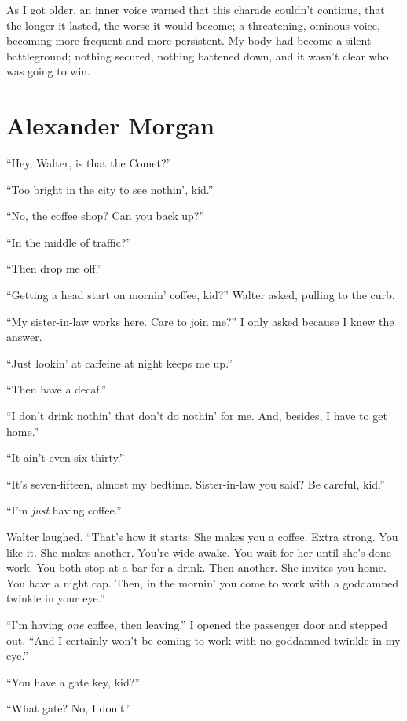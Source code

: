 As I got older, an inner voice warned that this charade couldn't
continue, that the longer it lasted, the worse it would become; a
threatening, ominous voice, becoming more frequent and more persistent.
My body had become a silent battleground; nothing secured, nothing
battened down, and it wasn't clear who was going to win.

\chapter{Alexander Morgan}

\titlemark

\hspace*{\parindent}``Hey, Walter, is that the Comet?''

``Too bright in the city to see nothin', kid.''

``No, the coffee shop? Can you back up?''

``In the middle of traffic?''

``Then drop me off.''

``Getting a head start on mornin' coffee, kid?'' Walter asked, pulling
to the curb.

``My sister-in-law works here. Care to join me?'' I only asked because I
knew the answer.

``Just lookin' at caffeine at night keeps me up.''

``Then have a decaf.''

``I don't drink nothin' that don't do nothin' for me. And, besides, I
have to get home.''

``It ain't even six-thirty.''

``It's seven-fifteen, almost my bedtime. Sister-in-law you said? Be
careful, kid.''

``I'm \emph{just} having coffee.''

Walter laughed. ``That's how it starts: She makes you a coffee. Extra
strong. You like it. She makes another. You're wide awake. You wait for
her until she's done work. You both stop at a bar for a drink. Then
another. She invites you home. You have a night cap. Then, in the
mornin' you come to work with a goddamned twinkle in your eye.''

``I'm having \emph{one} coffee, then leaving.'' I opened the passenger
door and stepped out. ``And I certainly won't be coming to work with no
goddamned twinkle in my eye.''

``You have a gate key, kid?''

``What gate? No, I don't.''


